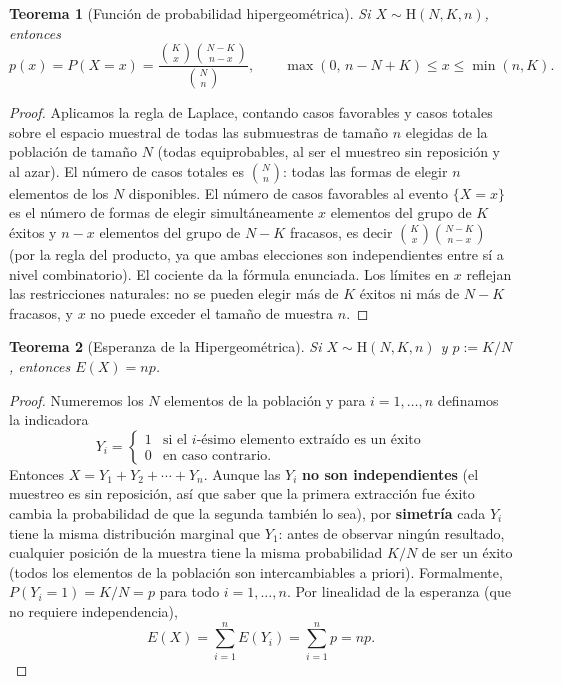 \documentclass[11pt,a4paper]{article}
\theoremstyle{plain}
\newtheorem{teorema}{Teorema}[section]
\theoremstyle{definition}
\theoremstyle{remark}
\begin{document}
\begin{teorema}[Función de probabilidad hipergeométrica]
Si $X\sim\text{H}(N,K,n)$, entonces
$$p(x)=P(X=x)=\frac{\binom{K}{x}\binom{N-K}{n-x}}{\binom{N}{n}}, \qquad \max(0,\,n-N+K)\le x\le\min(n,K).$$
\end{teorema}

\begin{proof}
Aplicamos la regla de Laplace, contando casos favorables y casos totales sobre el espacio muestral de todas las submuestras de tamaño $n$ elegidas de la población de tamaño $N$ (todas equiprobables, al ser el muestreo sin reposición y al azar). El número de casos totales es $\binom{N}{n}$: todas las formas de elegir $n$ elementos de los $N$ disponibles. El número de casos favorables al evento $\{X=x\}$ es el número de formas de elegir simultáneamente $x$ elementos del grupo de $K$ éxitos y $n-x$ elementos del grupo de $N-K$ fracasos, es decir $\binom{K}{x}\binom{N-K}{n-x}$ (por la regla del producto, ya que ambas elecciones son independientes entre sí a nivel combinatorio). El cociente da la fórmula enunciada. Los límites en $x$ reflejan las restricciones naturales: no se pueden elegir más de $K$ éxitos ni más de $N-K$ fracasos, y $x$ no puede exceder el tamaño de muestra $n$.
\end{proof}

\begin{teorema}[Esperanza de la Hipergeométrica]
Si $X\sim\text{H}(N,K,n)$ y $p:=K/N$, entonces $E(X)=np$.
\end{teorema}
\begin{proof}
Numeremos los $N$ elementos de la población y para $i=1,\dots,n$ definamos la indicadora
$$Y_i=\begin{cases}1 & \text{si el $i$-ésimo elemento extraído es un éxito}\\0 & \text{en caso contrario.}\end{cases}$$
Entonces $X=Y_1+Y_2+\cdots+Y_n$. Aunque las $Y_i$ \textbf{no son independientes} (el muestreo es sin reposición, así que saber que la primera extracción fue éxito cambia la probabilidad de que la segunda también lo sea), por \textbf{simetría} cada $Y_i$ tiene la misma distribución marginal que $Y_1$: antes de observar ningún resultado, cualquier posición de la muestra tiene la misma probabilidad $K/N$ de ser un éxito (todos los elementos de la población son intercambiables a priori). Formalmente, $P(Y_i=1)=K/N=p$ para todo $i=1,\dots,n$. Por linealidad de la esperanza (que no requiere independencia),
$$E(X)=\sum_{i=1}^n E(Y_i)=\sum_{i=1}^n p=np.$$
\end{proof}
\end{document}
